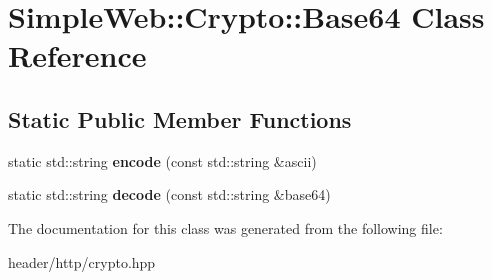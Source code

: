 \hypertarget{class_simple_web_1_1_crypto_1_1_base64}{}\section{Simple\+Web\+:\+:Crypto\+:\+:Base64 Class Reference}
\label{class_simple_web_1_1_crypto_1_1_base64}
\subsection*{Static Public Member Functions}
\begin{DoxyCompactItemize}
\item 
\mbox{\label{class_simple_web_1_1_crypto_1_1_base64_a299572ed812c789fa0a681bd94e282d0}} 
static std\+::string {\bfseries encode} (const std\+::string \&ascii)
\item 
\mbox{\label{class_simple_web_1_1_crypto_1_1_base64_ace7c4c2244925b5068e645cc1d791104}} 
static std\+::string {\bfseries decode} (const std\+::string \&base64)
\end{DoxyCompactItemize}


The documentation for this class was generated from the following file\+:\begin{DoxyCompactItemize}
\item 
header/http/crypto.\+hpp\end{DoxyCompactItemize}
